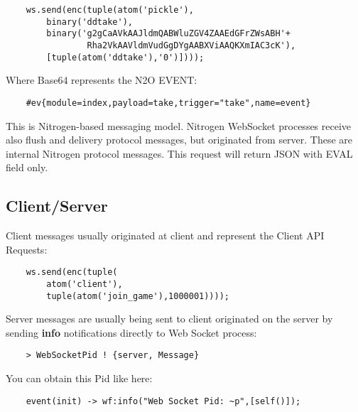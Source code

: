 \vspace{1\baselineskip}
\begin{lstlisting}
    ws.send(enc(tuple(atom('pickle'),
        binary('ddtake'),
        binary('g2gCaAVkAAJldmQABWluZGV4ZAAEdGFrZWsABH'+
                Rha2VkAAVldmVudGgDYgAABXViAAQKXmIAC3cK'),
        [tuple(atom('ddtake'),'0')])));
\end{lstlisting}
\vspace{1\baselineskip}

Where Base64 represents the N2O EVENT:

\vspace{1\baselineskip}
\begin{lstlisting}
    #ev{module=index,payload=take,trigger="take",name=event}
\end{lstlisting}
\vspace{1\baselineskip}

This is Nitrogen-based messaging model. Nitrogen WebSocket processes receive also
flush and delivery protocol messages, but originated from server. These are internal Nitrogen
protocol messages. This request will return JSON with EVAL field only.

\subsection{Client/Server}

Client messages usually originated at client and represent the Client API Requests:

\vspace{1\baselineskip}
\begin{lstlisting}
    ws.send(enc(tuple(
        atom('client'),
        tuple(atom('join_game'),1000001))));
\end{lstlisting}
\vspace{1\baselineskip}

Server messages are usually being sent to client originated on the
server by sending {\bf info} notifications directly to Web Socket process:

\vspace{1\baselineskip}
\begin{lstlisting}
    > WebSocketPid ! {server, Message}
\end{lstlisting}
\vspace{1\baselineskip}

You can obtain this Pid like here:

\vspace{1\baselineskip}
\begin{lstlisting}
    event(init) -> wf:info("Web Socket Pid: ~p",[self()]);
\end{lstlisting}
\vspace{1\baselineskip}

